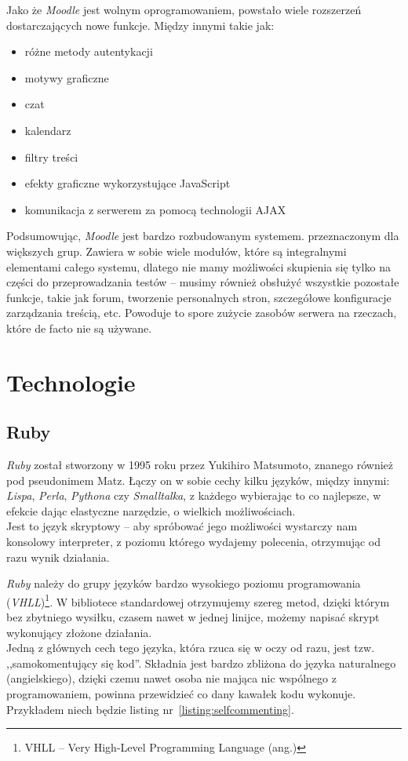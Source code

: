 \documentclass[a4paper,12pt]{article}
\begin{document}
Jako że \emph{Moodle} jest wolnym oprogramowaniem, powstało wiele rozszerzeń
dostarczających nowe funkcje. Między innymi takie jak:

\begin{itemize}
  \item{różne metody autentykacji}
  \item{motywy graficzne}
  \item{czat}
  \item{kalendarz}
  \item{filtry treści}
  \item{efekty graficzne wykorzystujące JavaScript}
  \item{komunikacja z serwerem za pomocą technologii AJAX}
\end{itemize}


Podsumowując, \emph{Moodle} jest bardzo rozbudowanym systemem. przeznaczonym dla większych
grup. Zawiera w sobie wiele modułów, które są integralnymi elementami całego systemu, dlatego
nie mamy możliwości skupienia się tylko na części do przeprowadzania testów -- musimy
również obsłużyć wszystkie pozostałe funkcje, takie jak forum, tworzenie personalnych
stron, szczegółowe konfiguracje zarządzania treścią, etc. Powoduje to spore zużycie
zasobów serwera na rzeczach, które de facto nie są używane.

\clearpage
\section{Technologie}
\subsection{Ruby}
\emph{Ruby} został stworzony w 1995 roku przez Yukihiro Matsumoto, znanego również
pod pseudonimem Matz. Łączy on w sobie cechy kilku języków, między innymi: \emph{Lispa},
\emph{Perla}, \emph{Pythona} czy \emph{Smalltalka}, z każdego wybierając to co najlepsze,
w efekcie dając elastyczne narzędzie, o wielkich możliwościach.\\
Jest to język skryptowy -- aby spróbować jego możliwości wystarczy nam konsolowy
interpreter, z poziomu którego wydajemy polecenia, otrzymując od razu wynik działania.


\emph{Ruby} należy do grupy języków bardzo wysokiego poziomu programowania
(\emph{VHLL})\footnote{VHLL -- Very High-Level Programming Language (ang.)}.
W bibliotece standardowej otrzymujemy szereg metod, dzięki którym bez zbytniego wysiłku,
czasem nawet w jednej linijce, możemy napisać skrypt wykonujący złożone działania.\\
Jedną z głównych cech tego języka, która rzuca się w oczy od razu, jest tzw.
,,samokomentujący się kod''. Składnia jest bardzo zbliżona do języka naturalnego
(angielskiego), dzięki czemu nawet osoba nie mająca nic wspólnego z programowaniem,
powinna przewidzieć co dany kawałek kodu wykonuje. Przykładem niech będzie
listing nr~\ref{listing:selfcommenting}.
\end{document}
